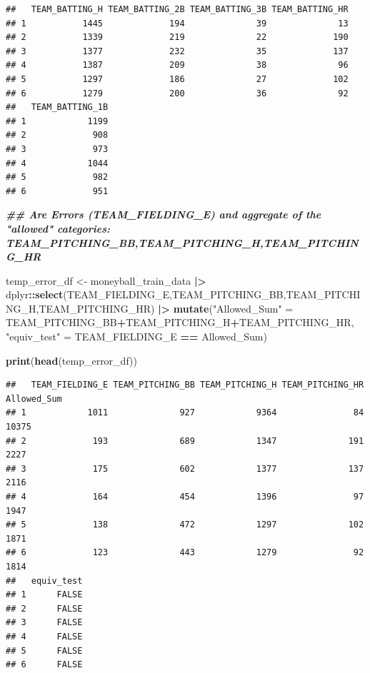 \documentclass[
]{article}
\newenvironment{Shaded}{\begin{snugshade}}{\end{snugshade}}
\newcommand{\DocumentationTok}[1]{\textcolor[rgb]{0.56,0.35,0.01}{\textbf{\textit{#1}}}}
\newcommand{\FunctionTok}[1]{\textcolor[rgb]{0.13,0.29,0.53}{\textbf{#1}}}
\newcommand{\NormalTok}[1]{#1}
\newcommand{\OtherTok}[1]{\textcolor[rgb]{0.56,0.35,0.01}{#1}}
\newcommand{\SpecialCharTok}[1]{\textcolor[rgb]{0.81,0.36,0.00}{\textbf{#1}}}
\newcommand{\StringTok}[1]{\textcolor[rgb]{0.31,0.60,0.02}{#1}}
\begin{document}
\begin{verbatim}
##   TEAM_BATTING_H TEAM_BATTING_2B TEAM_BATTING_3B TEAM_BATTING_HR
## 1           1445             194              39              13
## 2           1339             219              22             190
## 3           1377             232              35             137
## 4           1387             209              38              96
## 5           1297             186              27             102
## 6           1279             200              36              92
##   TEAM_BATTING_1B
## 1            1199
## 2             908
## 3             973
## 4            1044
## 5             982
## 6             951
\end{verbatim}

\begin{Shaded}
\begin{Highlighting}[]
\DocumentationTok{\#\# Are Errors (TEAM\_FIELDING\_E) and aggregate of the "allowed" categories: TEAM\_PITCHING\_BB,TEAM\_PITCHING\_H,TEAM\_PITCHING\_HR }

\NormalTok{temp\_error\_df }\OtherTok{\textless{}{-}}\NormalTok{ moneyball\_train\_data }\SpecialCharTok{|\textgreater{}}
\NormalTok{  dplyr}\SpecialCharTok{::}\FunctionTok{select}\NormalTok{(TEAM\_FIELDING\_E,TEAM\_PITCHING\_BB,TEAM\_PITCHING\_H,TEAM\_PITCHING\_HR) }\SpecialCharTok{|\textgreater{}}
  \FunctionTok{mutate}\NormalTok{(}\StringTok{"Allowed\_Sum"} \OtherTok{=}\NormalTok{  TEAM\_PITCHING\_BB}\SpecialCharTok{+}\NormalTok{TEAM\_PITCHING\_H}\SpecialCharTok{+}\NormalTok{TEAM\_PITCHING\_HR,}
         \StringTok{"equiv\_test"} \OtherTok{=}\NormalTok{ TEAM\_FIELDING\_E }\SpecialCharTok{==}\NormalTok{ Allowed\_Sum)}

\FunctionTok{print}\NormalTok{(}\FunctionTok{head}\NormalTok{(temp\_error\_df))}
\end{Highlighting}
\end{Shaded}

\begin{verbatim}
##   TEAM_FIELDING_E TEAM_PITCHING_BB TEAM_PITCHING_H TEAM_PITCHING_HR Allowed_Sum
## 1            1011              927            9364               84       10375
## 2             193              689            1347              191        2227
## 3             175              602            1377              137        2116
## 4             164              454            1396               97        1947
## 5             138              472            1297              102        1871
## 6             123              443            1279               92        1814
##   equiv_test
## 1      FALSE
## 2      FALSE
## 3      FALSE
## 4      FALSE
## 5      FALSE
## 6      FALSE
\end{verbatim}
\end{document}
